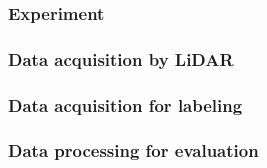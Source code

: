\subsubsection{Experiment}
\label{sec:test-experiment}


\subsubsection{Data acquisition by LiDAR}
\label{sec:test-lidar-data-acquisition}


\subsubsection{Data acquisition for labeling}
\label{sec:test-labeling}


\subsubsection{Data processing for evaluation}
\label{sec:test-evaluation}

